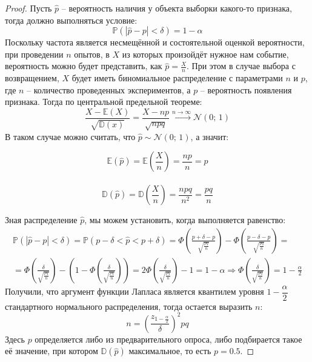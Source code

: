 \documentclass[12pt]{article}
\theoremstyle{definition}
\newcommand{\E}{\mathbb{E}}
\newcommand{\D}{\mathbb{D}}
\newcommand{\prob}{\mathbb{P}}
\newcommand{\nd}{\mathcal{N}}
\begin{document}
\begin{proof}
    Пусть $\hat{p}$ – вероятность наличия у объекта выборки какого-то признака, тогда должно выполняться условие:
    $$\prob(|\hat{p}-p|<\delta)=1-\alpha$$
    Поскольку частота является несмещённой и состоятельной оценкой вероятности, при проведении $n$ опытов, в $X$ из которых произойдёт нужное нам событие, вероятность можно будет представить, как $\hat{p}=\frac{X}{n}$. При этом в случае выбора с возвращением, $X$ будет иметь биномиальное распределение с параметрами $n$ и $p$, где $n$ – количество проведенных экспериментов, а $p$ – вероятность появления признака. Тогда по центральной предельной теореме:
    $$\frac{X-\E(X)}{\sqrt{\D(x)}}=\frac{X-np}{\sqrt{npq}}\xrightarrow{n\to\infty}\nd(0;\,1)$$
    В таком случае можно считать, что $\hat{p}\sim\nd(0;\,1)$, а значит:
    \begin{center}
        \begin{multicols}{2}
            \[\E(\hat{p})=\E\left(\frac{X}{n}\right)=\frac{np}{n}=p\]\\
            \[\D(\hat{p})=\D\left(\frac{X}{n}\right)=\frac{npq}{n^2}=\frac{pq}{n}\]
        \end{multicols}
    \end{center}
    Зная распределение $\hat{p}$, мы можем установить, когда выполняется равенство:
    \begin{multline*}
        \prob(|\hat{p}-p|<\delta)=\prob(p-\delta<\hat{p}<p+\delta)=\Phi\left(\frac{p+\delta-p}{\sqrt{\frac{pq}{n}}}\right) - \Phi\left(\frac{p-\delta-p}{\sqrt{\frac{pq}{n}}}\right)=\\
        =\Phi\left(\frac{\delta}{\sqrt{\frac{pq}{n}}}\right) - \left(1 - \Phi\left(\frac{\delta}{\sqrt{\frac{pq}{n}}}\right)\right)=2\Phi\left(\frac{\delta}{\sqrt{\frac{pq}{n}}}\right)-1=1-\alpha\Longrightarrow \Phi\left(\frac{\delta}{\sqrt{\frac{pq}{n}}}\right) = 1-\frac{\alpha}{2}
    \end{multline*}
    Получили, что аргумент функции Лапласа является квантилем уровня $1-\dfrac{\alpha}{2}$ стандартного нормального распределения, тогда остается выразить $n$:
    $$n=\left(\frac{z_{1-\frac{\alpha}{2}}}{\delta}\right)^2pq$$
    Здесь $p$ определяется либо из предварительного опроса, либо подбирается такое её значение, при котором $\D(\hat{p})$ максимальное, то есть $p=\num{0.5}$.
\end{proof}
\end{document}
